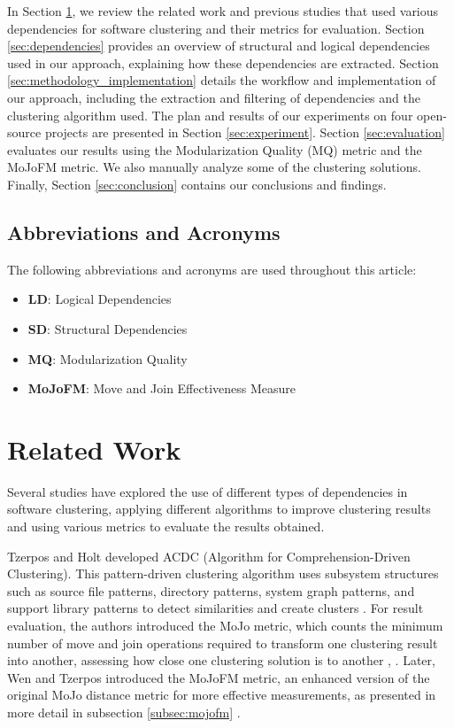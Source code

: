 \documentclass[12pt, a4paper, twoside]{report}
\begin{document}
In Section \ref{sec:related_work}, we review the related work and previous studies that used various dependencies for software clustering and their metrics for evaluation.
Section \ref{sec:dependencies} provides an overview of structural and logical dependencies used in our approach, explaining how these dependencies are extracted.
Section \ref{sec:methodology_implementation} details the workflow and implementation of our approach, including the extraction and filtering of dependencies and the clustering algorithm used.
The plan and results of our experiments on four open-source projects are presented in Section \ref{sec:experiment}. Section \ref{sec:evaluation} evaluates our results using the Modularization Quality (MQ) metric and the MoJoFM metric. We also manually analyze some of the clustering solutions.
Finally, Section \ref{sec:conclusion} contains our conclusions and findings.

\subsection{Abbreviations and Acronyms}

The following abbreviations and acronyms are used throughout this article:

\begin{itemize}
    \item \textbf{LD}: Logical Dependencies
    \item \textbf{SD}: Structural Dependencies
    \item \textbf{MQ}: Modularization Quality
    \item \textbf{MoJoFM}: Move and Join Effectiveness Measure
\end{itemize}

\section{Related Work}
\label{sec:related_work}

Several studies have explored the use of different types of dependencies in software clustering, applying different algorithms to improve clustering results and using various metrics to evaluate the results obtained.

Tzerpos and Holt developed ACDC (Algorithm for Comprehension-Driven Clustering). This pattern-driven clustering algorithm uses subsystem structures such as source file patterns, directory patterns, system graph patterns, and support library patterns to detect similarities and create clusters \cite{acdc}. For result evaluation, the authors introduced the MoJo metric, which counts the minimum number of move and join operations required to transform one clustering result into another, assessing how close one clustering solution is to another \cite{b3}, \cite{tzerpos1}. Later, Wen and Tzerpos introduced the MoJoFM metric, an enhanced version of the original MoJo distance metric for more effective measurements, as presented in more detail in subsection \ref{subsec:mojofm} \cite{mojofm}.
\end{document}
